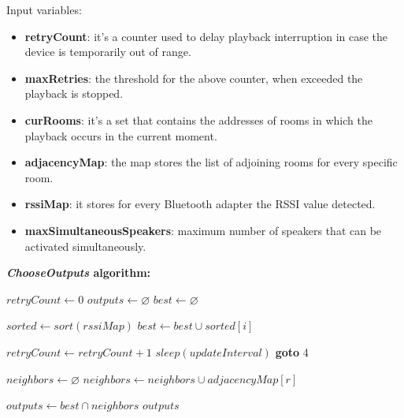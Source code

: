 \documentclass[conference]{IEEEtran}
\begin{document}
Input variables:
\begin{itemize}
\item \textbf{retryCount}: it's a counter used to delay playback interruption in case the device is temporarily out of range.
\item \textbf{maxRetries}: the threshold for the above counter, when exceeded the playback is stopped.
\item \textbf{curRooms}: it's a set that contains the addresses of rooms in which the playback occurs in the current moment.
\item \textbf{adjacencyMap}: the map stores the list of adjoining rooms for every specific room.
\item \textbf{rssiMap}: it stores for every Bluetooth adapter the RSSI value detected.
\item \textbf{maxSimultaneousSpeakers}: maximum number of speakers that can be activated simultaneously.
\end{itemize}

\vspace{0.3cm}
\textbf{\textit{ChooseOutputs} algorithm:}
\begin{algorithmic}[1]
\STATE $retryCount \gets 0$
\STATE $outputs \gets \varnothing$
\STATE $best \gets \varnothing$

\STATE $sorted \gets sort(rssiMap)$
	\STATE $best \gets best \cup sorted[i]$
\ENDFOR

	\STATE $retryCount \gets retryCount + 1$
	\STATE $sleep(updateInterval)$
	\STATE \textbf{goto} 4
\ENDIF

\STATE $neighbors \gets \varnothing$
	\STATE $neighbors \gets neighbors \cup adjacencyMap[r]$
\ENDFOR

\STATE $outputs \gets best \cap neighbors$
\RETURN $outputs$
\end{algorithmic}

\end{document}
